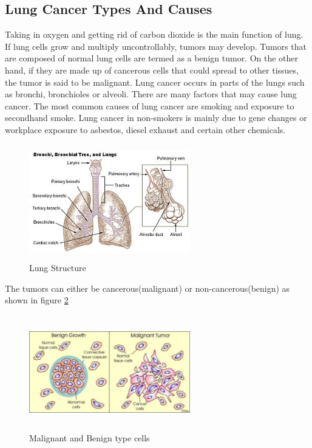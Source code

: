 \documentclass[conference]{IEEEtran}
\begin{document}
\subsection{Lung Cancer Types And Causes}
 Taking in oxygen and getting rid of carbon dioxide is the main function of lung. If lung cells grow and multiply uncontrollably, tumors may develop. Tumors that are composed of normal lung cells are termed as a benign tumor. On the other hand, if they are made up of cancerous cells that could spread to other tissues, the tumor is said to be malignant.  Lung cancer occurs in parts of the lungs such as bronchi, bronchioles or alveoli. There are many factors that may cause lung cancer. The most common causes of lung cancer are smoking and exposure to secondhand smoke. Lung cancer in non-smokers is mainly due to gene changes or workplace exposure to asbestos, diesel exhaust and certain other chemicals. 
\newblock
\begin{figure}[htbp]
\centerline{\includegraphics[width=7cm,height=5cm]{./figures/fig1.jpg}}
\caption{Lung Structure}
\label{fig1}
\end{figure}
The tumors can either be cancerous(malignant) or non-cancerous(benign) as shown in figure \ref{fig2}
\begin{figure}[htbp]
\centerline{\includegraphics[width=7cm,height=5cm]{./figures/fig2.jpg}}
\caption{Malignant and Benign type cells}
\label{fig2}
\end{figure}
\end{document}
